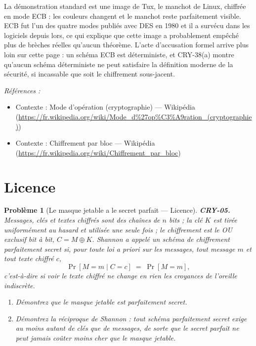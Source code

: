 \documentclass[11pt]{article}
\newtheorem{problem}{Problème}
\newenvironment{refs}{\par\small\noindent\emph{Références :}\begin{itemize}\setlength\itemsep{0pt}}{\end{itemize}\normalsize}
\begin{document}
\noindent La démonstration standard est une image de Tux, le manchot de Linux,
chiffrée en mode ECB : les couleurs changent et le manchot reste parfaitement visible. ECB
fut l'un des quatre modes publiés avec DES en 1980 et il a survécu dans les logiciels depuis
lors, ce qui explique que cette image a probablement empêché plus de brèches réelles
qu'aucun théorème. L'acte d'accusation formel arrive plus loin sur cette page : un schéma ECB
est déterministe, et CRY-38(a) montre qu'aucun schéma déterministe ne peut satisfaire la
définition moderne de la sécurité, si incassable que soit le chiffrement sous-jacent.

\begin{refs}
\item Contexte : Mode d'opération (cryptographie) --- Wikipédia (\url{https://fr.wikipedia.org/wiki/Mode_d%27op%C3%A9ration_(cryptographie)})
\item Contexte : Chiffrement par bloc --- Wikipédia (\url{https://fr.wikipedia.org/wiki/Chiffrement_par_bloc})
\end{refs}

\bigskip


\section*{Licence}

\begin{problem}[{Le masque jetable a le secret parfait --- Licence}]
\textbf{CRY-05.} Messages, clés et textes chiffrés sont des chaînes
de $n$ bits ; la clé $K$ est tirée uniformément au hasard et utilisée une seule fois ; le
chiffrement est le OU exclusif bit à bit, $C = M \oplus K$. Shannon a appelé un schéma de
chiffrement \textit{parfaitement secret} si, pour toute loi a priori sur les messages, tout
message $m$ et tout texte chiffré $c$,
\[ \Pr[M=m \mid C=c] \;=\; \Pr[M=m], \]
c'est-à-dire si voir le texte chiffré ne change en rien les croyances de l'oreille
indiscrète.
\begin{enumerate}
\item[(a)] Démontrez que le masque jetable est parfaitement secret.
\item[(b)] Démontrez la réciproque de Shannon :
tout schéma parfaitement secret exige au moins autant de clés que de messages, de sorte que
le secret parfait ne peut jamais coûter moins cher que le masque jetable.
\end{enumerate}

\end{problem}
\end{document}
